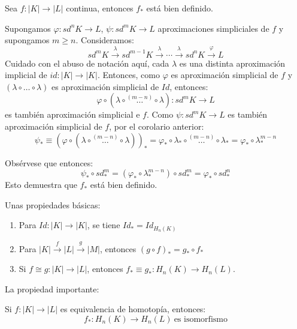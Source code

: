 \documentclass[HS.tex]{subfiles}
\begin{document}
\begin{coro}
Sea $f \colon |K| \to |L|$ continua, entonces $f_*$ está bien definido.
\end{coro}
\begin{dem}
Supongamos $\varphi \colon sd^n K \to L$, $\psi \colon sd^m K \to L$ aproximaciones simpliciales de $f$ y supongamos $m \geq n$.
Consideramos:
\[ sd^m K \xrightarrow{\lambda} sd^{m-1} K \xrightarrow{\lambda} \cdots\xrightarrow{\lambda} sd^n K \xrightarrow{\varphi} L \]
Cuidado con el abuso de notación aquí, cada $\lambda$ es una distinta aproximación implicial de $id \colon |K| \to |K|$.
Entonces, como $\varphi$ es aproximación simplicial de $f$ y $(\lambda \circ \dots \circ \lambda)$ es aproximación simplicial de $Id$, entonces:
\[ \varphi \circ (\lambda \circ \overset{(m-n)}{\dots} \circ \lambda) \colon sd^m K \to L\]
es también aproximación simplicial e $f$.
Como $\psi \colon sd^m K \to L$ es también aproximación simplicial de $f$, por el corolario anterior:
\[ \psi_* \equiv (\varphi \circ (\lambda\circ\overset{(m-n)}{\dots} \circ \lambda))_* = \varphi_* \circ \lambda_* \circ \overset{(m-n)}{\dots}\circ \lambda_* = \varphi_* \circ \lambda_*^{m-n}\]

Obsérvese que entonces:
\[ \psi_* \circ sd_*^m = (\varphi_* \circ \lambda_*^{m-n}) \circ sd_*^m =  \varphi_* \circ sd_*^n \]
Esto demuestra que $f_*$ está bien definido.
\end{dem}

Unas propiedades básicas:
\begin{propi}\mbox{}
\begin{enumerate}
	\item Para $Id \colon |K| \to |K|$, se tiene $Id_* = Id_{H_n(K)}$
	\item Para $|K| \xrightarrow{f} |L| \xrightarrow{g} |M|$, entonces $(g \circ f)_* = g_* \circ f_*$
	\item Si $f \cong g\colon |K| \to |L|$, entonces $f_* \equiv g_* \colon H_n(K) \to H_n(L)$.
\end{enumerate}
\end{propi}
La propiedad importante:
\begin{coro}
Si $f \colon |K| \to |L|$ es equivalencia de homotopía, entonces:
\[ f_* \colon H_n(K) \to H_n(L) \ \text{es isomorfismo}\]
\end{coro}
\end{document}
